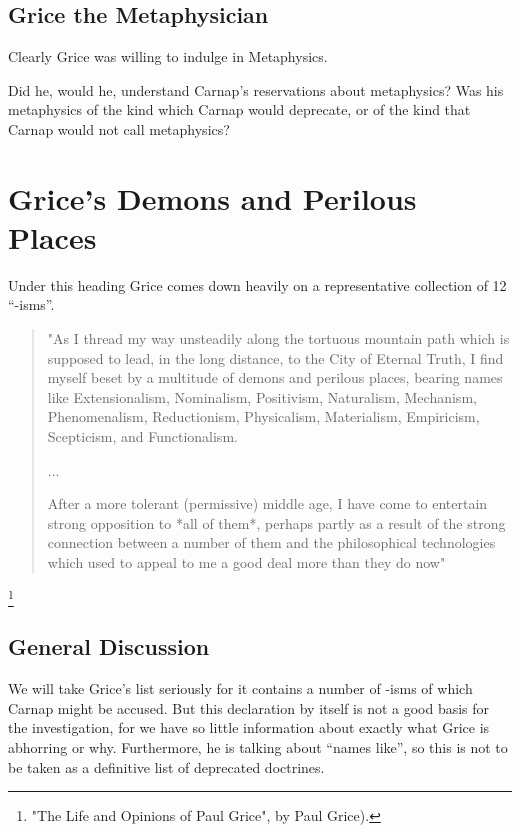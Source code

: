 \documentclass[10pt,titlepage]{book}
\begin{document}
\subsection{Grice the Metaphysician}

Clearly Grice was willing to indulge in Metaphysics.

Did he, would he, understand Carnap's reservations about metaphysics?
Was his metaphysics of the kind which Carnap would deprecate, or of the kind that Carnap would not call metaphysics?


\section{Grice's Demons and Perilous Places}

Under this heading Grice comes down heavily on a representative collection of 12 ``-isms''.

\begin{quote}
"As I thread my way unsteadily along the   tortuous mountain 
path which is supposed to lead, in the long  distance,  
to the City of Eternal Truth, I find myself beset by a  
multitude of demons and perilous places, bearing names like  
Extensionalism, Nominalism, Positivism, Naturalism, Mechanism,  
Phenomenalism, Reductionism, Physicalism, Materialism,  
Empiricism, Scepticism, and Functionalism. 

...

After a more tolerant (permissive)  middle age, I have come to  
entertain strong opposition to *all of them*, 
perhaps partly as a result of the strong connection between a  number 
of them and the philosophical technologies which used to appeal  
to me a good deal more than they do  now"
\end{quote}
\footnote{"The Life and Opinions of Paul Grice", by Paul Grice).\cite{grice86c}}

\subsection{General Discussion}

We will take Grice's list seriously for it contains a number of -isms of which Carnap might be accused.
But this declaration by itself is not a good basis for the investigation, for we have so little information about exactly what Grice is abhorring or why.
Furthermore, he is talking about ``names like'', so this is not to be taken as a definitive list of deprecated doctrines.
\end{document}
